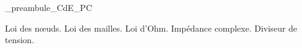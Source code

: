 %




\ifdefined\mainIsLoaded\else
  \RequirePackage{import}
  {_preambule_CdE_PC}

\fi



\debutFicheEntrainement                                                                      %


\begin{prerequis}
  Loi des nœuds. Loi des mailles. Loi d’Ohm. Impédance complexe. Diviseur de tension.
\end{prerequis}





